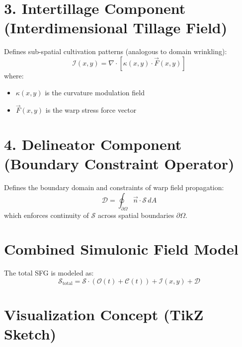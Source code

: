 \documentclass{article}
\begin{document}
\section*{3. Intertillage Component (Interdimensional Tillage Field)}

Defines sub-spatial cultivation patterns (analogous to domain wrinkling):
\[
\mathcal{I}(x, y) = \nabla \cdot \left[ \kappa(x, y) \cdot \vec{F}(x, y) \right]
\]
where:
\begin{itemize}
    \item $\kappa(x, y)$ is the curvature modulation field
    \item $\vec{F}(x, y)$ is the warp stress force vector
\end{itemize}

\section*{4. Delineator Component (Boundary Constraint Operator)}

Defines the boundary domain and constraints of warp field propagation:
\[
\mathcal{D} = \oint_{\partial \Omega} \vec{n} \cdot \mathcal{S} \, dA
\]
which enforces continuity of $\mathcal{S}$ across spatial boundaries $\partial \Omega$.

\section*{Combined Simulonic Field Model}

The total SFG is modeled as:
\[
\boxed{
\mathcal{S}_{\text{total}} = \mathcal{S} \cdot \left( \mathcal{O}(t) + \mathcal{C}(t) \right) + \mathcal{I}(x, y) + \mathcal{D}
}
\]

\section*{Visualization Concept (TikZ Sketch)}

\begin{center}
\end{center}
\end{document}
